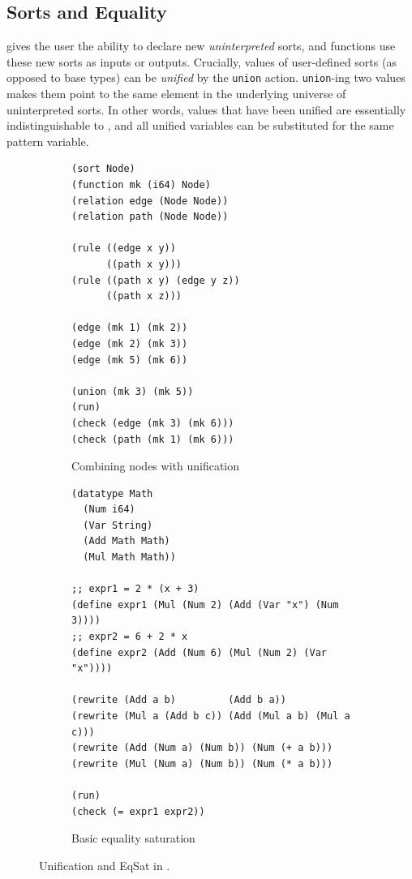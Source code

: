 \subsection{Sorts and Equality}

\Egglog gives the user the ability to declare new
 \emph{uninterpreted} sorts,
 and functions use these new sorts as inputs or outputs.
Crucially, values of user-defined sorts (as opposed to base types)
 can be \emph{unified} by the \lstinline{union} action.
\lstinline{union}-ing two values makes them point to the same element 
 in the underlying universe of uninterpreted sorts.
In other words, 
 values that have been unified are essentially indistinguishable
 to \egglog, 
 and all unified variables can be substituted for the same pattern variable.

\begin{figure}
    \centering
    \begin{subfigure}[t]{0.40\linewidth}
        \begin{lstlisting}[language=egglog]
(sort Node)
(function mk (i64) Node)
(relation edge (Node Node))
(relation path (Node Node))
            
(rule ((edge x y))
      ((path x y)))
(rule ((path x y) (edge y z))
      ((path x z)))

(edge (mk 1) (mk 2))
(edge (mk 2) (mk 3))
(edge (mk 5) (mk 6))

(union (mk 3) (mk 5))
(run)
(check (edge (mk 3) (mk 6)))
(check (path (mk 1) (mk 6)))
\end{lstlisting}
        \caption{Combining nodes with unification}
        \label{fig:egglog-unification:a}
    \end{subfigure}
    \begin{subfigure}[t]{0.55\linewidth}
        \begin{lstlisting}[language=egglog]
(datatype Math
  (Num i64)
  (Var String)
  (Add Math Math)
  (Mul Math Math))

;; expr1 = 2 * (x + 3)
(define expr1 (Mul (Num 2) (Add (Var "x") (Num 3)))) 
;; expr2 = 6 + 2 * x
(define expr2 (Add (Num 6) (Mul (Num 2) (Var "x"))))

(rewrite (Add a b)         (Add b a))
(rewrite (Mul a (Add b c)) (Add (Mul a b) (Mul a c)))
(rewrite (Add (Num a) (Num b)) (Num (+ a b)))
(rewrite (Mul (Num a) (Num b)) (Num (* a b)))

(run)
(check (= expr1 expr2))
\end{lstlisting}
        \caption{Basic equality saturation}
        \label{fig:egglog-unification:b}
    \end{subfigure}
    \caption{
        Unification and EqSat in \egglog.
    }
    \label{fig:egglog-unification}
\end{figure}

